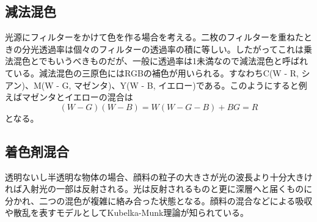 		\subsection{減法混色}
			光源にフィルターをかけて色を作る場合を考える。二枚のフィルターを重ねたときの分光透過率は個々のフィルターの透過率の積に等しい。したがってこれは乗法混色とでもいうべきものだが、一般に透過率は1未満なので減法混色と呼ばれている。減法混色の三原色にはRGBの補色が用いられる。すなわちC(W - R, シアン)、M(W - G, マゼンタ)、Y(W - B, イエロー)である。このようにすると例えばマゼンタとイエローの混合は
				\[(W - G)(W - B) = W(W - G - B) + BG = R\]
			となる。
		\subsection{着色剤混合}
			透明ないし半透明な物体の場合、顔料の粒子の大きさが光の波長より十分大きければ入射光の一部は反射される。光は反射されるものと更に深層へと届くものに分かれ、二つの混色が複雑に絡み合った状態となる。顔料の混合などによる吸収や散乱を表すモデルとしてKubelka-Munk理論が知られている。